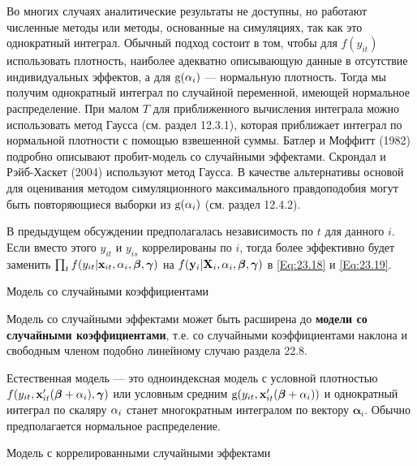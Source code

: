Во многих случаях аналитические результаты не доступны, но работают численные методы или методы, основанные на симуляциях, так как это однократный интеграл. Обычный подход состоит в том, чтобы для $f(y_{it})$ использовать плотность, наиболее адекватно описывающую данные  в отсутствие индивидуальных эффектов, а для $\mathrm g(\alpha_i)$ --- нормальную плотность. Тогда мы получим однократный интеграл по случайной переменной, имеющей нормальное распределение. При малом $T$ для приближенного вычисления интеграла можно использовать метод Гаусса (см. раздел 12.3.1), которая приближает интеграл по нормальной плотности с помощью взвешенной суммы. Батлер и Моффитт (1982) подробно описывают пробит-модель со случайными эффектами. Скрондал и Рэйб-Хаскет (2004) используют метод Гаусса. В качестве альтернативы основой для оценивания методом симуляционного максимального правдоподобия могут быть  повторяющиеся выборки из $\mathrm g(\alpha_i)$ (см. раздел 12.4.2).

В предыдущем обсуждении предполагалась независимость по $t$ для данного $i$. Если вместо этого $y_{it}$ и $y_{is}$ коррелированы по $i$, тогда более эффективно будет заменить $\prod_t f(y_{it}|\mathbf{x}_{it}, \alpha_i, \bm{\beta}, \bm\gamma)$ на $ f(\mathbf{y}_i|\mathbf{X}_i, \alpha_i, \bm{\beta}, \bm\gamma)$ в \ref{Eq:23.18} и \ref{Eq:23.19}.

{\centering Модель со случайными коэффициентами \\}

Модель со случайными эффектами может быть расширена до \textbf{модели со случайными коэффициентами}, т.е. со случайными коэффициентами наклона и свободным членом подобно линейному случаю раздела 22.8.

Естественная модель --- это одноиндексная модель с условной плотностью $f(y_{it}, \mathbf{x}'_{it}(\bm{\beta}+\alpha_i),\bm\gamma)$ или условным средним $\mathrm g(y_{it}, \mathbf{x}'_{it}(\bm{\beta}+\alpha_i))$ и однократный интеграл по скаляру $\alpha_i$  станет многократным интегралом по вектору $\bm\alpha_i$. Обычно предполагается нормальное распределение.

{\centering Модель с коррелированными случайными эффектами \\}
  
